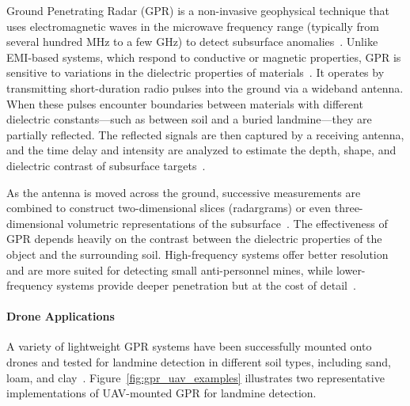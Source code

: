Ground Penetrating Radar (GPR) is a non-invasive geophysical technique that uses electromagnetic waves in the microwave frequency range (typically from several hundred MHz to a few GHz) to detect subsurface anomalies~\cite{gichd2006guidebook}. Unlike EMI-based systems, which respond to conductive or magnetic properties, GPR is sensitive to variations in the dielectric properties of materials~\cite{Gooneratne2004ARO}. It operates by transmitting short-duration radio pulses into the ground via a wideband antenna. When these pulses encounter boundaries between materials with different dielectric constants—such as between soil and a buried landmine—they are partially reflected. The reflected signals are then captured by a receiving antenna, and the time delay and intensity are analyzed to estimate the depth, shape, and dielectric contrast of subsurface targets~\cite{alqudsi2021review,paik2002image}.

As the antenna is moved across the ground, successive measurements are combined to construct two-dimensional slices (radargrams) or even three-dimensional volumetric representations of the subsurface~\cite{Bruschini1997ASO}. The effectiveness of GPR depends heavily on the contrast between the dielectric properties of the object and the surrounding soil. High-frequency systems offer better resolution and are more suited for detecting small anti-personnel mines, while lower-frequency systems provide deeper penetration but at the cost of detail~\cite{gichd2006guidebook}.

\paragraph{Drone Applications} A variety of lightweight GPR systems have been successfully mounted onto drones and tested for landmine detection in different soil types, including sand, loam, and clay~\cite{cerquera2017uav,vsipovs2020lightweight,colorado2017integrated,garcia2020airborne,garcia2019autonomous,burr2018design,fernandez2021development,lee2023modeling,sipos2017drone,garcia2022safedrone,schartel2018uav,chen2023ground}. Figure~\ref{fig:gpr_uav_examples} illustrates two representative implementations of UAV-mounted GPR for landmine detection.

